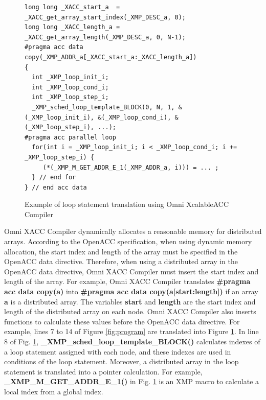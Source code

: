 \begin{figure}[h]
\begin{center}
\begin{lstlisting}
long long _XACC_start_a  = _XACC_get_array_start_index(_XMP_DESC_a, 0);
long long _XACC_length_a = _XACC_get_array_length(_XMP_DESC_a, 0, N-1);
#pragma acc data copy(_XMP_ADDR_a[_XACC_start_a:_XACC_length_a])
{
  int _XMP_loop_init_i;
  int _XMP_loop_cond_i;
  int _XMP_loop_step_i;
  _XMP_sched_loop_template_BLOCK(0, N, 1, &(_XMP_loop_init_i), &(_XMP_loop_cond_i), &(_XMP_loop_step_i), ...);
#pragma acc parallel loop
  for(int i = _XMP_loop_init_i; i < _XMP_loop_cond_i; i += _XMP_loop_step_i) {
     (*(_XMP_M_GET_ADDR_E_1(_XMP_ADDR_a, i))) = ... ;
  } // end for
} // end acc data
\end{lstlisting}
\end{center} 
\caption{Example of loop statement translation using Omni XcalableACC Compiler} \label{fig:program2}
\end{figure}

Omni XACC Compiler dynamically allocates a reasonable memory for distributed arrays.
According to the OpenACC specification, 
when using dynamic memory allocation, 
the start index and length of the array must be specified in the OpenACC data directive.
Therefore, when using a distributed array in the OpenACC data directive,
Omni XACC Compiler must insert the start index and length of the array.
For example, Omni XACC Compiler translates {\bf \#pragma acc data copy(a)} into {\bf \#pragma acc data copy(a[start:length])} if an array {\bf a} is a distributed array.
The variables {\bf start} and {\bf length} are the start index and length of the distributed array on each node.
Omni XACC Compiler also inserts functions to calculate these values before the OpenACC data directive.
For example, lines 7 to 14 of Figure \ref{fig:program} are translated into  Figure \ref{fig:program2}.
In line 8 of Fig. \ref{fig:program2}, {\bf \_XMP\_sched\_loop\_template\_BLOCK()} calculates indexes of a loop statement assigned with each node,
and these indexes are used in conditions of the loop statement.
Moreover, 
a distributed array in the loop statement is translated into a pointer calculation.
For example, {\bf \_XMP\_M\_GET\_ADDR\_E\_1()} in Fig. \ref{fig:program2} is an XMP macro to calculate a local index from a global index.
  
